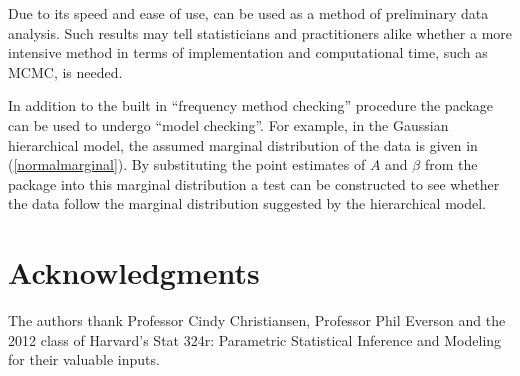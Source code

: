 \documentclass[article]{jss}
\begin{document}
Due to its speed and ease of use,  can be used as a method of preliminary data analysis. Such results may tell statisticians and practitioners alike whether a more intensive method in terms of implementation and computational time, such as MCMC, is needed. 


In addition to the built in ``frequency method checking'' procedure the package can be used to undergo ``model checking''. For example, in the Gaussian hierarchical model, the assumed marginal distribution of the data is given in (\ref{normalmarginal}). By substituting the point estimates of $A$ and $\beta$ from the package into this marginal distribution a test can be constructed to see whether the data follow the marginal distribution suggested by the hierarchical model.


\section[acknowledgments]{Acknowledgments}
The authors thank Professor Cindy Christiansen, Professor Phil Everson and the 2012 class of Harvard's Stat 324r: Parametric Statistical Inference and Modeling for their valuable inputs.


\end{document}
